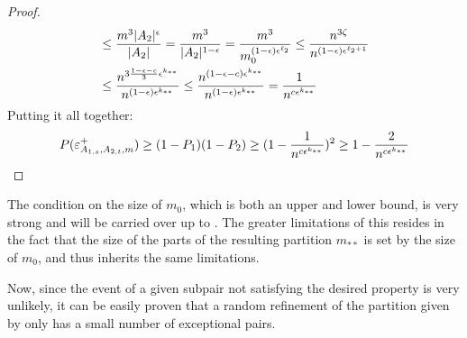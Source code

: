 \begin{lemma}[Claim 4.13]
\begin{proof}
\[\begin{split}
                        & \leq \frac{m^3 |A_2|^\epsilon}{|A_2|}
                            = \frac{m^3}{|A_2|^{1-\epsilon}}
                            = \frac{m^3}{m_0^{\parround{1-\epsilon} \epsilon^{\ell_2}}} %
                            \leq \frac{n^{3 \zeta}}{n^{(1-\epsilon)\epsilon^{\ell_2 + 1}}} \\
                        & \leq \frac{n^{3\frac{1-\epsilon-c}{3} \epsilon^{k_{**}}}}{n^{(1-\epsilon)\epsilon^{k_{**}}}}
                            \leq \frac{n^{(1-\epsilon-c) \epsilon^{k_{**}}}}{n^{(1-\epsilon)\epsilon^{k_{**}}}}
                            = \frac{1}{n^{c \epsilon^{k_{**}}}}
                \end{split}
            \]
            Putting it all together:
            \[
                P(\varepsilon^+_{A_{1,s},A_{2,t},m})
                    \geq (1 - P_1) (1 - P_2)
                    \geq ( 1 - \frac{1}{n^{c \epsilon^{k_{**}}}} )^2
                    \geq 1 - \frac{2}{n^{c\epsilon^{k_{**}}}}
            \]
        \end{proof}
    \end{lemma}

    \begin{remark}
        The condition on the size of $m_0$, which is both an upper and lower bound, is very strong and will be carried over
        up to .
        The greater limitations of this resides in the fact that the size of the parts of the resulting partition $m_{**}$
        is set by the size of $m_0$, and thus inherits the same limitations.
    \end{remark}

    Now, since the event of a given subpair not satisfying the desired property is very unlikely, it can be easily proven
    that a random refinement of the partition given by  only has
    a small number of exceptional pairs.

